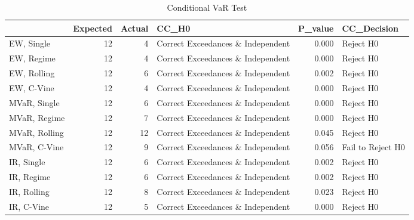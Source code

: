 \begin{table}

\caption{Conditional VaR Test}
\centering
\begin{tabular}[t]{lrrlrl}
\toprule
  & Expected & Actual & CC\_H0 & P\_value & CC\_Decision\\
\midrule
EW, Single & 12 & 4 & Correct Exceedances \& Independent & 0.000 & Reject H0\\
EW, Regime & 12 & 4 & Correct Exceedances \& Independent & 0.000 & Reject H0\\
EW, Rolling & 12 & 6 & Correct Exceedances \& Independent & 0.002 & Reject H0\\
EW, C-Vine & 12 & 4 & Correct Exceedances \& Independent & 0.000 & Reject H0\\
MVaR, Single & 12 & 6 & Correct Exceedances \& Independent & 0.000 & Reject H0\\
\addlinespace
MVaR, Regime & 12 & 7 & Correct Exceedances \& Independent & 0.000 & Reject H0\\
MVaR, Rolling & 12 & 12 & Correct Exceedances \& Independent & 0.045 & Reject H0\\
MVaR, C-Vine & 12 & 9 & Correct Exceedances \& Independent & 0.056 & Fail to Reject H0\\
IR, Single & 12 & 6 & Correct Exceedances \& Independent & 0.002 & Reject H0\\
IR, Regime & 12 & 6 & Correct Exceedances \& Independent & 0.002 & Reject H0\\
\addlinespace
IR, Rolling & 12 & 8 & Correct Exceedances \& Independent & 0.023 & Reject H0\\
IR, C-Vine & 12 & 5 & Correct Exceedances \& Independent & 0.000 & Reject H0\\
\bottomrule
\end{tabular}
\end{table}
